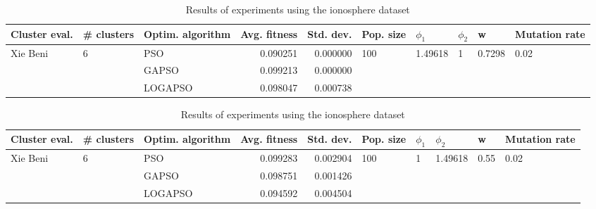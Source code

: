 \documentclass{article}
\begin{document}
\begin{table}
\centering
\caption{Results of experiments using the ionosphere dataset}
\begin{tabular}{lllrrlllll}
\toprule
            Cluster eval. &        \# clusters & Optim. algorithm &  Avg. fitness &  Std. dev. &            Pop. size &               $\phi_{1}$ &         $\phi_{2}$ &                       w &         Mutation rate \\
\midrule
\multirow{3}{*}{Xie Beni} & \multirow{3}{*}{6} &              PSO &      0.090251 &   0.000000 & \multirow{3}{*}{100} & \multirow{3}{*}{1.49618} & \multirow{3}{*}{1} & \multirow{3}{*}{0.7298} & \multirow{3}{*}{0.02} \\
                          &                    &            GAPSO &      0.099213 &   0.000000 &                      &                          &                    &                         &                       \\
                          &                    &          LOGAPSO &      0.098047 &   0.000738 &                      &                          &                    &                         &                       \\
\bottomrule
\end{tabular}
\end{table}
\begin{table}
\centering
\caption{Results of experiments using the ionosphere dataset}
\begin{tabular}{lllrrlllll}
\toprule
            Cluster eval. &        \# clusters & Optim. algorithm &  Avg. fitness &  Std. dev. &            Pop. size &         $\phi_{1}$ &               $\phi_{2}$ &                     w &         Mutation rate \\
\midrule
\multirow{3}{*}{Xie Beni} & \multirow{3}{*}{6} &              PSO &      0.099283 &   0.002904 & \multirow{3}{*}{100} & \multirow{3}{*}{1} & \multirow{3}{*}{1.49618} & \multirow{3}{*}{0.55} & \multirow{3}{*}{0.02} \\
                          &                    &            GAPSO &      0.098751 &   0.001426 &                      &                    &                          &                       &                       \\
                          &                    &          LOGAPSO &      0.094592 &   0.004504 &                      &                    &                          &                       &                       \\
\bottomrule
\end{tabular}
\end{table}
\end{document}
